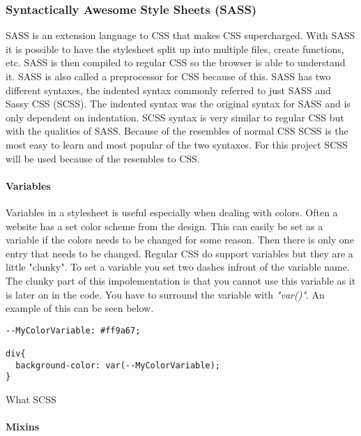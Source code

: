 \subsubsection{Syntactically Awesome Style Sheets (SASS)}%
\label{sub:sass}
SASS is an extension language to CSS that makes CSS supercharged. With SASS it is possible to have the stylesheet split up into multiple files, create functions, etc. SASS is then compiled to regular CSS so the browser is able to understand it. SASS is also called a preprocessor for CSS because of this.  SASS has two different syntaxes, the indented syntax commonly referred to just SASS and Sassy CSS (SCSS). The indented syntax was the original syntax for SASS and is only dependent on indentation. SCSS syntax is very similar to regular CSS but with the qualities of SASS. Because of the resembles of normal CSS SCSS is the most easy to learn and most popular of the two syntaxes. For this project SCSS will be used because of the resembles to CSS.

\paragraph{Variables}
Variables in a stylesheet is useful especially when dealing with colors. Often a website has a set color scheme from the design. This can easily be set as a variable if the colors needs to be changed for some reason. Then there is only one entry that needs to be changed. Regular CSS do support variables but they are a little "clunky". To set a variable you set two dashes infront of the variable name. The clunky part of this impolementation is that you cannot use this variable as it is later on in the code. You have to surround the variable with \textit{"var()"}. An example of this can be seen below.

\begin{lstlisting}[style=htmlcssjs]
--MyColorVariable: #ff9a67; 

div{
  background-color: var(--MyColorVariable);
}
\end{lstlisting}

What SCSS 


\paragraph{Mixins}



